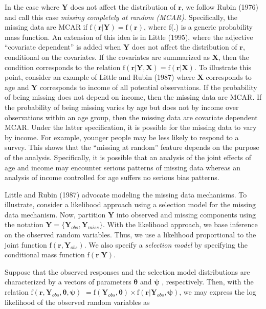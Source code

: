In the case where $\mathbf{Y}$ does not affect the distribution of
$\mathbf{r}$, we follow Rubin (1976) and call this case
\emph{missing completely at random (MCAR)}. Specifically, the
missing data are MCAR if $\mathrm{f}(\mathbf{r} | \mathbf{Y}) =
\mathrm{f}(\mathbf{r})$, where f(.) is a generic probability mass
function. An extension of this idea is in Little (1995), where the
adjective ``covariate dependent'' is added when $\mathbf{Y}$ does
not affect the distribution of $\mathbf{r}$, conditional on the
covariates. If the covariates are summarized as $\mathbf{X}$, then
the condition corresponds to the relation $\mathrm{f}(\mathbf{r} |
\mathbf{Y, X}) = \mathrm{f}(\mathbf{r | X})$. To illustrate this
point, consider an example of Little and Rubin (1987) where
$\mathbf{X}$ corresponds to age and $\mathbf{Y}$ corresponds to
income of all potential observations. If the probability of being
missing does not depend on income, then the missing data are MCAR.
If the probability of being missing varies by age but does not by
income over observations within an age group, then the missing data
are covariate dependent MCAR. Under the latter specification, it is
possible for the missing data to vary by income. For example,
younger people may be less likely to respond to a survey. This shows
that the ``missing at random'' feature depends on the purpose of the
analysis. Specifically, it is possible that an analysis of the joint
effects of age and income may encounter serious patterns of missing
data whereas an analysis of income controlled for age suffers no
serious bias patterns.

Little and Rubin (1987) advocate modeling the missing data
mechanisms. To illustrate, consider a likelihood approach using a
selection model for the missing data mechanism. Now, partition
$\mathbf{Y}$ into observed and missing components using the notation
$\mathbf{Y} =\{\mathbf{Y}_{obs}, \mathbf{Y}_{miss}\}$. With the
likelihood approach, we base inference on the observed random
variables. Thus, we use a likelihood proportional to the joint
function $\mathrm{f}(\mathbf{r}, \mathbf{Y}_{obs})$. We also specify
a \emph{selection model} by specifying the conditional mass function
$\mathrm{f}(\mathbf{r} | \mathbf{Y})$.

Suppose that the observed responses and the selection model
distributions are characterized by a vectors of parameters
$\boldsymbol \theta$ and $\boldsymbol \psi$ , respectively. Then,
with the relation $\mathrm{f}(\mathbf{r}, \mathbf{Y}_{obs},
\boldsymbol \theta, \boldsymbol \psi)$ $ =
\mathrm{f}(\mathbf{Y}_{obs}, \boldsymbol \theta) \times
\mathrm{f}(\mathbf{r} | \mathbf{Y}_{obs}, \boldsymbol \psi)$, we may
express the log likelihood of the observed random variables as

